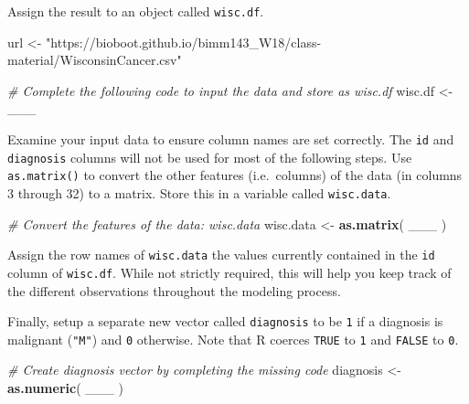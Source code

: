 \documentclass[]{article}
\newenvironment{Shaded}{\begin{snugshade}}{\end{snugshade}}
\newcommand{\KeywordTok}[1]{\textcolor[rgb]{0.13,0.29,0.53}{\textbf{#1}}}
\newcommand{\StringTok}[1]{\textcolor[rgb]{0.31,0.60,0.02}{#1}}
\newcommand{\CommentTok}[1]{\textcolor[rgb]{0.56,0.35,0.01}{\textit{#1}}}
\newcommand{\OperatorTok}[1]{\textcolor[rgb]{0.81,0.36,0.00}{\textbf{#1}}}
\newcommand{\NormalTok}[1]{#1}
\begin{document}
Assign the result to an object called \texttt{wisc.df}.

\begin{Shaded}
\begin{Highlighting}[]
\NormalTok{url <-}\StringTok{ "https://bioboot.github.io/bimm143_W18/class-material/WisconsinCancer.csv"}

\CommentTok{# Complete the following code to input the data and store as wisc.df}
\NormalTok{wisc.df <-}\StringTok{ }\NormalTok{___}
\end{Highlighting}
\end{Shaded}

Examine your input data to ensure column names are set correctly. The
\texttt{id} and \texttt{diagnosis} columns will not be used for most of
the following steps. Use \texttt{as.matrix()} to convert the other
features (i.e.~columns) of the data (in columns 3 through 32) to a
matrix. Store this in a variable called \texttt{wisc.data}.

\begin{Shaded}
\begin{Highlighting}[]
\CommentTok{# Convert the features of the data: wisc.data}
\NormalTok{wisc.data <-}\StringTok{ }\KeywordTok{as.matrix}\NormalTok{( ___ )}
\end{Highlighting}
\end{Shaded}

Assign the row names of \texttt{wisc.data} the values currently
contained in the \texttt{id} column of \texttt{wisc.df}. While not
strictly required, this will help you keep track of the different
observations throughout the modeling process.

\begin{Shaded}
\end{Shaded}

Finally, setup a separate new vector called \texttt{diagnosis} to be
\texttt{1} if a diagnosis is malignant (\texttt{"M"}) and \texttt{0}
otherwise. Note that R coerces \texttt{TRUE} to \texttt{1} and
\texttt{FALSE} to \texttt{0}.

\begin{Shaded}
\begin{Highlighting}[]
\CommentTok{# Create diagnosis vector by completing the missing code}
\NormalTok{diagnosis <-}\StringTok{ }\KeywordTok{as.numeric}\NormalTok{( ___ )}
\end{Highlighting}
\end{Shaded}
\end{document}
